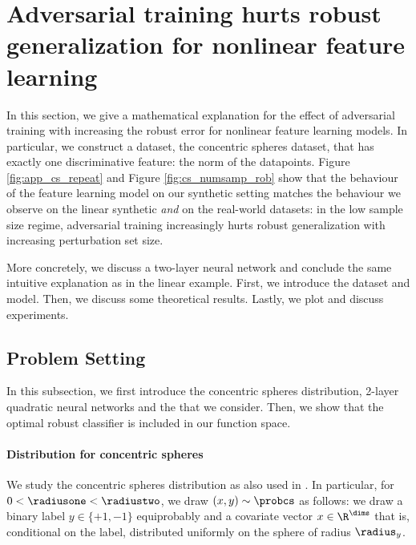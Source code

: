 \section{Adversarial training hurts robust generalization for nonlinear feature learning}
\label{sec:app_theorycs}

In this section, we give a mathematical explanation for the effect of
adversarial training with \nameofattacks increasing the robust error
for nonlinear feature learning models. In particular, we construct a
dataset, the concentric spheres dataset, that has exactly one discriminative
feature: the norm of the datapoints. Figure \ref{fig:app_cs_repeat}
and Figure \ref{fig:cs_numsamp_rob} show that the behaviour of the
feature learning model on our synthetic setting matches the behaviour
we observe on the linear synthetic \emph{and} on the real-world
datasets: in the low sample size regime, adversarial training
increasingly hurts robust generalization with increasing perturbation
set size.

More concretely, we discuss a two-layer neural network and conclude the same intuitive explanation as in the linear example. First, we introduce the dataset and model. Then, we discuss some theoretical results. Lastly, we plot and discuss experiments.

\subsection{Problem Setting}
In this subsection, we first introduce the concentric spheres distribution, 2-layer quadratic neural networks and the \nameofattack that we consider. Then, we show that the optimal robust classifier is included in our function space.

\paragraph{Distribution for concentric spheres}
We study the concentric spheres distribution as also used in
\cite{gilmer18, kolter19}. In particular, for
$0<\radiusone<\radiustwo$, we draw $(x,y) \sim \probcs$ as follows: we draw a binary label $y\in \{+1, -1\}$
equiprobably and a covariate vector $x \in \R^{\dims}$ that is,
conditional on the label, distributed uniformly on the sphere of
radius $\radius_{y}$.

